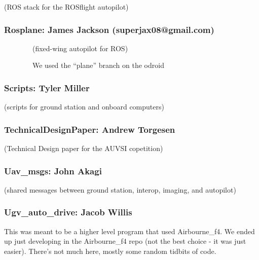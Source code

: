 \documentclass[]{auvsi_doc}
\begin{document}
{(ROS stack for the ROSflight autopilot)}

{}

\hypertarget{h.rfp5kydue3f1}{\subsubsection{\texorpdfstring{{Rosplane:
James Jackson
(}{superjax08@gmail.com}{)}}{Rosplane: James Jackson (superjax08@gmail.com)}}\label{h.rfp5kydue3f1}}

{~~~~~~~~(fixed-wing autopilot for ROS)}

{~~~~~~~~We used the ``plane'' branch on the odroid}

{}

\hypertarget{h.hbcl1x4i3t9h}{\subsubsection{\texorpdfstring{{Scripts:
Tyler Miller}}{Scripts: Tyler Miller}}\label{h.hbcl1x4i3t9h}}

{(scripts for ground station and onboard computers)}

\hypertarget{h.6tkhkdxr0376}{\subsubsection{\texorpdfstring{{TechnicalDesignPaper:
Andrew
Torgesen}}{TechnicalDesignPaper: Andrew Torgesen}}\label{h.6tkhkdxr0376}}

{(Technical Design paper for the AUVSI copetition)}

\hypertarget{h.gpyymqyjiqy0}{\subsubsection{\texorpdfstring{{Uav\_msgs:
John Akagi}}{Uav\_msgs: John Akagi}}\label{h.gpyymqyjiqy0}}

{(shared messages between ground station, interop, imaging, and
autopilot)}

\hypertarget{h.lnuk2wx0zogg}{\subsubsection{\texorpdfstring{{Ugv\_auto\_drive:
Jacob Willis}}{Ugv\_auto\_drive: Jacob Willis}}\label{h.lnuk2wx0zogg}}

{This was meant to be a higher level program that used Airbourne\_f4. We
ended up just developing in the Airbourne\_f4 repo (not the best choice
- it was just easier). There's not much here, mostly some random tidbits
of code.}
\end{document}

